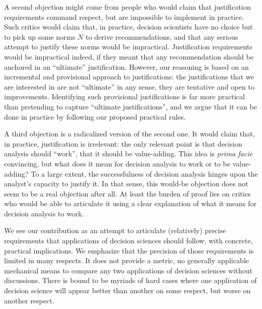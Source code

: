 \documentclass[preprint, french, english, 11pt, authoryear]{elsarticle}%
\begin{document}
A second objection might come from people who would claim that justification requirements command respect, but are impossible to implement in practice. Such critics would claim that, in practice, decision scientists have no choice but to pick up some norms $N$ to derive recommendations, and that any serious attempt to justify these norms would be impractical. Justification requirements would be impractical indeed, if they meant that any recommendation should be anchored in an “ultimate” justification. However, our reasoning is based on an incremental and provisional approach to justifications: the justifications that we are interested in are not ``ultimate'' in any sense, they are tentative and open to improvements. Identifying such provisional justifications is far more practical than pretending to capture ``ultimate justifications'', and we argue that it can be done in practice by following our proposed practical rules.

A third objection is a radicalized version of the second one. It would claim that, in practice, justification is irrelevant: the only relevant point is that decision analysis should ``work'', that it should be value-adding. This idea is \emph{prima facie} convincing, but what does it mean for decision analysis to work or to be value-adding? 
To a large extent, the successfulness of decision analysis hinges upon the analyst's capacity to justify it. In that sense, this would-be objection does not seem to be a real objection after all. At least the burden of proof lies on critics who would be able to articulate it using a clear explanation of what it means for decision analysis to work. 

We see our contribution as an attempt to articulate (relatively) precise requirements that applications of decision sciences should follow, with concrete, practical implications. We emphasize that the precision of those requirements is limited in many respects.
It does not provide a metric, no generally applicable mechanical means to compare any two applications of decision sciences without discussions. There is bound to be myriads of hard cases where one application of decision science will appear better than another on some respect, but worse on another respect.
\end{document}
